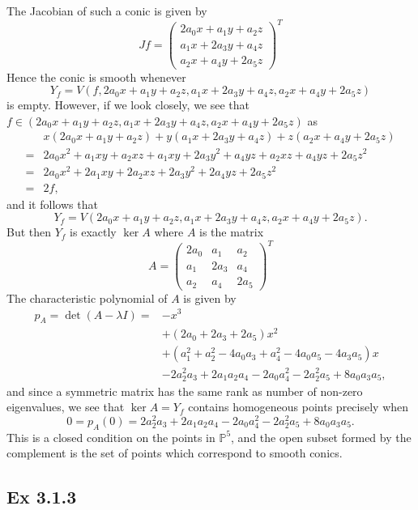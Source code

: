 \documentclass{article}
\theoremstyle{definition}
\renewcommand{\P}{\mathbb{P}}
\newcommand{\PP}[1]{\P^{#1}}
\begin{document}
The Jacobian of such a conic is given by
\[
Jf
=
\begin{pmatrix}
	2a_0 x + a_1y + a_2z \\
	a_1 x + 2a_3 y + a_4 z \\
	a_2 x + a_4 y + 2 a_5 z
\end{pmatrix}^T
\] 
Hence the conic is smooth whenever
\[
	Y_f = 
	V\left(
		f,
		2a_0 x + a_1y + a_2z, 
		a_1 x + 2a_3 y + a_4 z, 
		a_2 x + a_4 y + 2 a_5 z
	\right)
\]
is empty. However, if we look closely, we 
see that $f \in (2a_0 x + a_1y + a_2z, a_1 x + 2a_3 y + a_4 z, a_2 x + a_4 y + 2 a_5 z)$
as
\begin{align*} 
		&x(2a_0 x + a_1y + a_2z) +
		y(a_1 x + 2a_3 y + a_4 z) +
		z(a_2 x + a_4 y + 2 a_5 z) \\
		=
		&2a_0 x^2 + a_1 xy + a_2 xz +
		a_1 xy + 2a_3 y^2 + a_4y z +
		a_2 xz + a_4 yz + 2a_5 z^2 \\
		=
		&2a_0 x^2 + 2a_1 xy + 2 a_2 xz +
		2a_3 y^2 + 2 a_4y z +
		2a_5 z^2 \\
		=
		&2 f,
\end{align*}
and it follows that
\[
	Y_f = 
	V\left(
		2a_0 x + a_1y + a_2z, 
		a_1 x + 2a_3 y + a_4 z, 
		a_2 x + a_4 y + 2 a_5 z
	\right).
\] 
But then $Y_f$ is exactly $\ker A$ where $A$
is the matrix
\[
A
=
\begin{pmatrix}
	2a_0 & a_1 & a_2 \\
	a_1 & 2a_3 & a_4 \\
	a_2 & a_4 & 2 a_5
\end{pmatrix}^T
\]
The characteristic polynomial of $A$ is given by
\begin{align*}
	p_A = \det(A - \lambda I) 
	=
	&-
	x^{3} \\
	&+
	\left(2a_0+2a_3+2a_5\right)x^{2} \\
	&+
	\left(a_1^{2}+a_2^{2}-4a_0a_3+a_4^{2}-4a_0a_5-4a_3a_5\right)x \\
	&-
	2a_2^{2}a_3+2a_1a_2a_4-2a_0a_4^{2}-2a_{ 2}^{2}a_5+8a_0a_3a_5,
\end{align*} 
and since a symmetric matrix has the same rank as number of non-zero
eigenvalues, we see that $\ker A = Y_f$ contains homogeneous points precisely
when
\[
	0 
	= 
	p_A(0)
	=
	2a_2^{2}a_3+2a_1a_2a_4-2a_0a_4^{2}-2a_{ 2}^{2}a_5+8a_0a_3a_5.
\] 
This is a closed condition on the points in $\PP{5}$, and the open subset
formed by the complement is the set of points which correspond to smooth
conics.

\subsection*{Ex 3.1.3}
\end{document}
